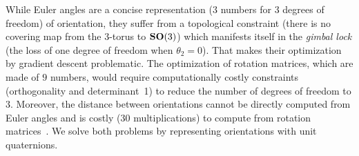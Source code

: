 While Euler angles are a concise representation ($3$ numbers for $3$ degrees of freedom) of orientation, they suffer from a topological constraint (there is no covering map from the $3$-torus to $\mathrm{\mathbf{SO}}(3)$) which manifests itself in the \textit{gimbal lock} (the loss of one degree of freedom when $\theta_2=0$). %
That makes their optimization by gradient descent problematic.
The optimization of rotation matrices, which are made of $9$ numbers, would require computationally costly constraints (orthogonality and determinant~1) to reduce the number of degrees of freedom to $3$.
Moreover, the distance between orientations cannot be directly computed from Euler angles and is costly (30 multiplications) to compute from rotation matrices~\cite{huynh2009metrics}.
We solve both problems by representing orientations with unit quaternions.

